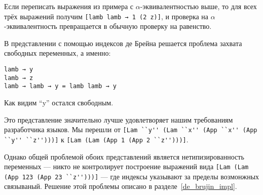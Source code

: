 Если переписать выражения из примера с $\alpha$-эквивалентностью выше, то для всех трёх выражений получим \lstinline{[lamb lamb → 1 (2 z)]}, и проверка на $\alpha$-эквивалентность превращается в обычную проверку на равенство.

В представлении с помощью индексов де Брейна решается проблема захвата свободных переменных, а именно:
\begin{lstlisting}
lamb → y
lamb → z
lamb → lamb → y = lamb lamb → y
\end{lstlisting}

Как видим ``y'' остался свободным.

Это представление значительно лучше удовлетворяет нашим требованиям разработчика языков. Мы перешли от
\lstinline{[Lam ``y'' (Lam ``x'' (App ``x'' (App ``y'' ``z'')))]} к \lstinline{[Lam (Lam (App 1 (App 2 ``z'')))]}.

Однако общей проблемой обоих представлений является нетипизированность переменных --- никто не контролирует построение выражений вида \lstinline{[Lam (Lam (App 123 (App 23 ``z'')))]} --- где индексы указывают за пределы возмонжных связываный. Решение этой проблемы описано в разделе~\ref{de_brujin_impl}.
